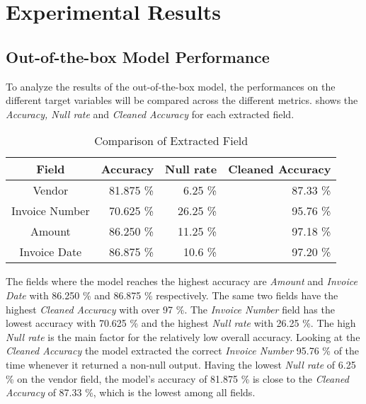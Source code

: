 \chapter{Experimental Results}

\section{Out-of-the-box Model Performance}

To analyze the results of the out-of-the-box model, the performances on the different target variables will be compared across the different metrics.  shows the \textit{Accuracy, Null rate} and \textit{Cleaned Accuracy} for each extracted field. 

\begin{table}[ht]   %
    \centering
    \footnotesize
    \begin{tabular}{c|rrr} %
        \toprule    %
        Field  & Accuracy  & Null rate & Cleaned Accuracy \\
        \midrule    %
        Vendor           & 81.875 \%   &  6.25 \%   & 87.33 \% \\
        Invoice Number   & 70.625 \%   & 26.25 \%  & 95.76 \%\\
        Amount           & 86.250 \%   & 11.25 \%  & 97.18 \% \\
        Invoice Date     & 86.875 \%   & 10.6  \%  & 97.20 \% \\
        \bottomrule %
    \end{tabular}
    \caption{Comparison of Extracted Field}
    \label{table:Field_Com}
\end{table}

The fields where the model reaches the highest accuracy are \textit{Amount} and \textit{Invoice Date} with 86.250 \% and 86.875 \% respectively. The same two fields have the highest \textit{Cleaned Accuracy} with over 97 \%. The \textit{Invoice Number} field has the lowest accuracy with 70.625 \% and the highest \textit{Null rate} with 26.25 \%. The high \textit{Null rate} is the main factor for the relatively low overall accuracy. Looking at the \textit{Cleaned Accuracy} the model extracted the correct \textit{Invoice Number} 95.76 \% of the time whenever it returned a non-null output. Having the lowest \textit{Null rate} of 6.25 \% on the vendor field, the model's accuracy of 81.875 \% is close to the \textit{Cleaned Accuracy} of 87.33 \%, which is the lowest among all fields. 

